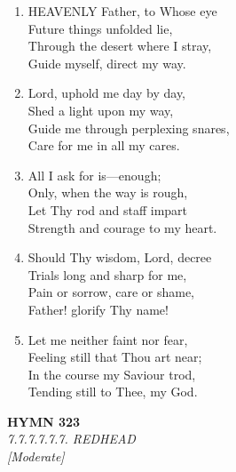 \begin{enumerate}
    \item HEAVENLY Father, to Whose eye \\
        Future things unfolded lie, \\
        Through the desert where I stray, \\
        Guide myself, direct my way.

    \item Lord, uphold me day by day, \\
        Shed a light upon my way, \\
        Guide me through perplexing snares, \\
        Care for me in all my cares.

    \item All I ask for is---enough; \\
        Only, when the way is rough, \\
        Let Thy rod and staff impart \\
        Strength and courage to my heart.

    \item Should Thy wisdom, Lord, decree \\
        Trials long and sharp for me, \\
        Pain or sorrow, care or shame, \\
        Father! glorify Thy name!

    \item Let me neither faint nor fear, \\
        Feeling still that Thou art near; \\
        In the course my Saviour trod, \\
        Tending still to Thee, my God.

\end{enumerate}

\newpage
\begin{center}
    {\Large \textbf{HYMN 323}}
    \\
    \textit{7.7.7.7.7.7. REDHEAD}
    \\
    \textit{\small [Moderate]}
\end{center}
\vspace{1em}


